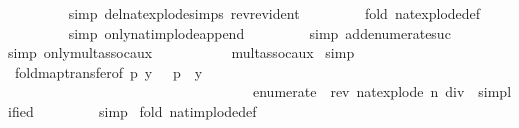 \begin{isabellebody}
\ \ \ \ \ \ \ \ \isamarkupfalse%
{\isacharparenleft}{\kern0pt}simp\ del{\isacharcolon}{\kern0pt}nat{\isacharunderscore}{\kern0pt}explode{\isacharprime}{\kern0pt}{\isachardot}{\kern0pt}simps\ rev{\isacharunderscore}{\kern0pt}rev{\isacharunderscore}{\kern0pt}ident{\isacharparenright}{\kern0pt}\isanewline
\ \ \ \ \ \ \ \ \isamarkupfalse%
{\isacharparenleft}{\kern0pt}fold\ nat{\isacharunderscore}{\kern0pt}explode{\isacharunderscore}{\kern0pt}def{\isacharparenright}{\kern0pt}\isanewline
\ \ \ \ \ \ \ \ \isamarkupfalse%
{\isacharparenleft}{\kern0pt}simp\ only{\isacharcolon}{\kern0pt}nat{\isacharunderscore}{\kern0pt}implode{\isacharunderscore}{\kern0pt}append{\isacharparenright}{\kern0pt}\isanewline
\ \ \ \ \ \ \ \ \isamarkupfalse%
{\isacharparenleft}{\kern0pt}simp\ add{\isacharcolon}{\kern0pt}enumerate{\isacharunderscore}{\kern0pt}suc{\isacharparenright}{\kern0pt}\isanewline
\ \ \ \ \ \ \ \ \isamarkupfalse%
{\isacharparenleft}{\kern0pt}simp\ only{\isacharcolon}{\kern0pt}mult{\isacharunderscore}{\kern0pt}assoc{\isacharunderscore}{\kern0pt}aux{}{\isacharparenright}{\kern0pt}\ \isanewline
\ \ \ \ \ \ \ \ \isamarkupfalse%
\ mult{\isacharunderscore}{\kern0pt}assoc{\isacharunderscore}{\kern0pt}aux{}\ \isamarkupfalse%
{\isacharparenleft}{\kern0pt}simp{\isacharparenright}{\kern0pt}\isanewline
\ \ \ \ \ \ \ \ \isamarkupfalse%
\ fold{\isacharunderscore}{\kern0pt}map{\isacharunderscore}{\kern0pt}transfer{\isacharbrackleft}{\kern0pt}of\ {\isacartoucheopen}{\isasymlambda}{\isacharparenleft}{\kern0pt}p{\isacharcomma}{\kern0pt}\ y{\isacharparenright}{\kern0pt}{\isachardot}{\kern0pt}\ {}{}\ {\isacharcircum}{\kern0pt}\ p\ {\isacharasterisk}{\kern0pt}\ y{\isacartoucheclose}\ \isanewline
\ \ \ \ \ \ \ \ \ \ \ \ \ \ \ \ \ \ \ \ \ \ \ \ \ \ \ \ \ \ \ \ \ \ \ {\isacartoucheopen}{\isacharparenleft}{\kern0pt}enumerate\ {}\ {\isacharparenleft}{\kern0pt}rev\ {\isacharparenleft}{\kern0pt}nat{\isacharunderscore}{\kern0pt}explode\ {\isacharparenleft}{\kern0pt}n\ div\ {}{}{\isacharparenright}{\kern0pt}{\isacharparenright}{\kern0pt}{\isacharparenright}{\kern0pt}{\isacharparenright}{\kern0pt}{\isacartoucheclose}{\isacharcomma}{\kern0pt}\ simplified{\isacharbrackright}{\kern0pt}\isanewline
\ \ \ \ \ \ \ \ \isamarkupfalse%
{\isacharparenleft}{\kern0pt}simp{\isacharparenright}{\kern0pt}\ \isamarkupfalse%
{\isacharparenleft}{\kern0pt}fold\ nat{\isacharunderscore}{\kern0pt}implode{\isacharunderscore}{\kern0pt}def{\isacharparenright}{\kern0pt}\ \isamarkupfalse%

\end{isabellebody}
